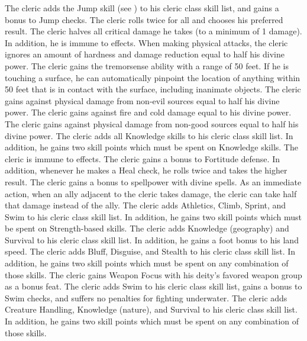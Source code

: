     The cleric adds the Jump skill (see ) to his cleric class skill list, and gains a  bonus to Jump checks.
    The cleric rolls twice for all  and chooses his preferred result.
    The cleric halves all critical damage he takes (to a minimum of 1 damage).
    In addition, he is immune to  effects.
    When making physical attacks, the cleric ignores an amount of hardness and damage reduction equal to half his divine power.
    The cleric gains the tremorsense ability with a range of 50 feet.
    If he is touching a surface, he can automatically pinpoint the location of anything within 50 feet that is in contact with the surface, including inanimate objects.
    The cleric gains  against physical damage from non-evil sources equal to half his divine power.
    The cleric gains  against fire and cold damage equal to his divine power.
    The cleric gains  against physical damage from non-good sources equal to half his divine power.
    The cleric adds all Knowledge skills to his cleric class skill list.
    In addition, he gains two skill points which must be spent on Knowledge skills.
    The cleric is immune to  effects.
    The cleric gains a  bonus to Fortitude defense.
    In addition, whenever he makes a Heal check, he rolls twice and takes the higher result.
    The cleric gains a  bonus to spellpower with divine spells.
    As an immediate action, when an ally adjacent to the cleric takes damage, the cleric can take half that damage instead of the ally.
    The cleric adds Athletics, Climb, Sprint, and Swim to his cleric class skill list.
    In addition, he gains two skill points which must be spent on Strength-based skills.
    The cleric adds Knowledge (geography) and Survival to his cleric class skill list.
    In addition, he gains a  foot bonus to his land speed.
    The cleric adds Bluff, Disguise, and Stealth to his cleric class skill list.
    In addition, he gains two skill points which must be spent on any combination of those skills.
    The cleric gains Weapon Focus with his deity's favored weapon group as a bonus feat.
    The cleric adds Swim to his cleric class skill list, gains a  bonus to Swim checks, and suffers no penalties for fighting underwater.
    The cleric adds Creature Handling, Knowledge (nature), and Survival to his cleric class skill list.
    In addition, he gains two skill points which must be spent on any combination of those skills.

